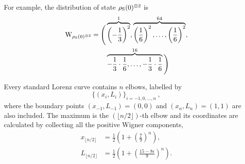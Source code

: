 For example, the distribution of state $\rho_{\rm{S}}(0)^{\otimes 2}$ is
\begin{equation*}
	\begin{split}
	\rm{W}_{\rho_{\rm{S}}(0)^{\otimes 2}} = \Bigg( &\overbrace{\left( -\frac{1}{3} \right)^2}^1, \overbrace{\left( \frac{1}{6} \right)^2, \dots, \left( \frac{1}{6} \right)^2}^{64}, \\
	&\overbrace{ -\frac{1}{3} \cdot \frac{1}{6}, \dots, -\frac{1}{3} \cdot \frac{1}{6}}^{16} \Bigg)
	\end{split}
\end{equation*}

Every standard Lorenz curve contains $n$ elbows, labelled by 
\begin{equation*}
\{(x_{i}, L_{i})\}_{i=-1,0,\dots,n}\ ,
\end{equation*}
where the boundary points $(x_{-1}, L_{-1}) = (0,0)$ and $(x_{n}, L_{n}) = (1,1)$ are also included.
The maximum is the $(\lfloor n/2 \rfloor)$-th elbow and its coordinates are calculated by collecting all the positive Wigner components,
\begin{align}
	x_{\lfloor n/2 \rfloor} &= \frac{1}{2}\left(1 + \left(\frac{7}{9}\right)^n\right), \\
	L_{\lfloor n/2 \rfloor} &= \frac{1}{2}\left (1 + \left(\frac{15 - 8\epsilon}{9}\right)^n \right).
\end{align}

